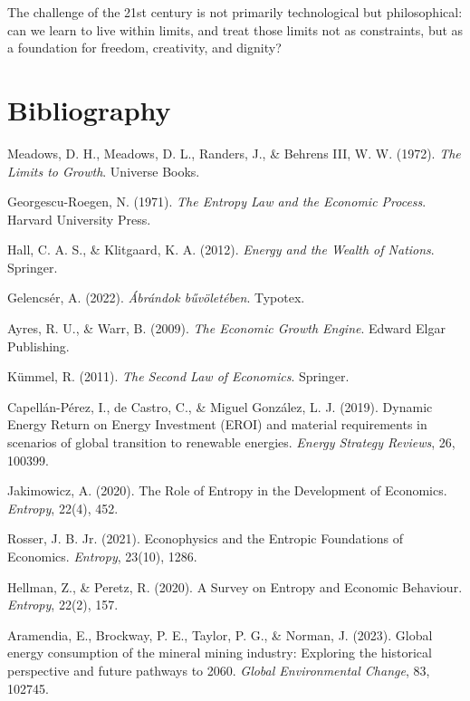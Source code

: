 \documentclass[a4paper,12pt]{article}
\begin{document}
The challenge of the 21st century is not primarily technological but philosophical: can we learn to live within limits, and treat those limits not as constraints, but as a foundation for freedom, creativity, and dignity?

\section{Bibliography}
\begin{thebibliography}{10}

Meadows, D. H., Meadows, D. L., Randers, J., \& Behrens III, W. W. (1972). \textit{The Limits to Growth}. Universe Books.

Georgescu-Roegen, N. (1971). \textit{The Entropy Law and the Economic Process}. Harvard University Press.

Hall, C. A. S., \& Klitgaard, K. A. (2012). \textit{Energy and the Wealth of Nations}. Springer.

Gelencsér, A. (2022). \textit{Ábrándok bűvöletében}. Typotex.

Ayres, R. U., \& Warr, B. (2009). \textit{The Economic Growth Engine}. Edward Elgar Publishing.

Kümmel, R. (2011). \textit{The Second Law of Economics}. Springer.

Capellán-Pérez, I., de Castro, C., \& Miguel González, L. J. (2019). Dynamic Energy Return on Energy Investment (EROI) and material requirements in scenarios of global transition to renewable energies. \textit{Energy Strategy Reviews}, 26, 100399.

Jakimowicz, A. (2020). The Role of Entropy in the Development of Economics. \textit{Entropy}, 22(4), 452.

Rosser, J. B. Jr. (2021). Econophysics and the Entropic Foundations of Economics. \textit{Entropy}, 23(10), 1286.

Hellman, Z., \& Peretz, R. (2020). A Survey on Entropy and Economic Behaviour. \textit{Entropy}, 22(2), 157.

Aramendia, E., Brockway, P. E., Taylor, P. G., \& Norman, J. (2023). Global energy consumption of the mineral mining industry: Exploring the historical perspective and future pathways to 2060. \textit{Global Environmental Change}, 83, 102745.

\end{thebibliography}\newpage
\end{document}
